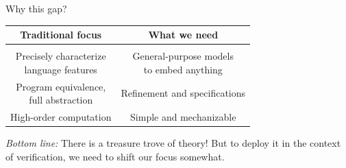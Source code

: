 \documentclass{beamer}
\begin{document}
\begin{frame}[fragile]{Why this gap?} %
  \centering
  \begin{tabular}{cc}
    \hline
    Traditional focus &
    What we need
    \\
    \hline
    \\
    \pause
    \parbox{.45\textwidth}{
      \centering
      Precisely characterize \\ language features
    } &
    \pause
    \parbox{.45\textwidth}{
      \centering
      General-purpose models \\ to embed anything
    } \\[1.5em]
    \pause
    \parbox{.45\textwidth}{
      \centering
      Program equivalence, \\ full abstraction
    } &
    \pause
    \parbox{.45\textwidth}{
      \centering
      Refinement and specifications
    } \\[1.5em]
    \pause High-order computation &
    \pause Simple and mechanizable \pause \\[1.5em]
    \hline
  \end{tabular}

  \emph{Bottom line:}
  There is a treasure trove of theory!
  But to deploy it in the context of verification,
  we need to shift our focus somewhat.
\end{frame}
\end{document}
